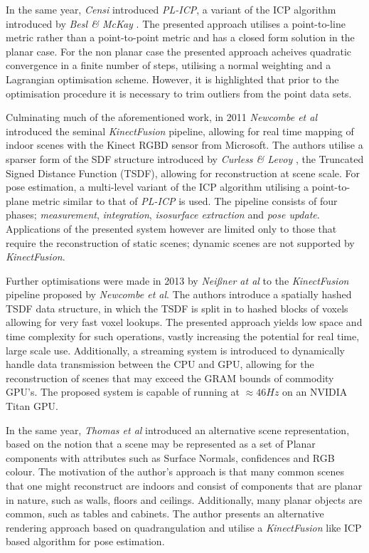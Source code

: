 In the same year, \textit{Censi} \cite{Censi2008} introduced \textit{PL-ICP}, a 
variant of the ICP algorithm introduced by \textit{Besl \& McKay} \cite{Besl1992}. 
The presented approach utilises a point-to-line metric rather than a point-to-point 
metric and has a closed form solution in the planar case. For the non planar case 
the presented approach acheives quadratic convergence in a finite number of steps, 
utilising a normal weighting and a Lagrangian optimisation scheme. However, it is 
highlighted that prior to the optimisation procedure it is necessary to trim outliers 
from the point data sets.

Culminating much of the aforementioned work, in 2011 \textit{Newcombe et al} introduced 
the seminal \textit{KinectFusion} pipeline, allowing for real time mapping of indoor 
scenes with the Kinect RGBD sensor from Microsoft. The authors utilise a sparser form 
of the SDF structure introduced by \textit{Curless \& Levoy} \cite{Curless1996}, the 
Truncated Signed Distance Function (TSDF), allowing for reconstruction at scene scale. 
For pose estimation, a multi-level variant of the ICP algorithm utilising a point-to-plane 
metric similar to that of \textit{PL-ICP} \cite{Censi2008} is used. The pipeline consists 
of four phases; \textit{measurement}, \textit{integration}, \textit{isosurface extraction} 
and \textit{pose update}. Applications of the presented system however are limited only to 
those that require the reconstruction of static scenes; dynamic scenes are not supported 
by \textit{KinectFusion}.

Further optimisations were made in 2013 by \textit{Nei{\ss}ner at al} \cite{NieBner2013} to the 
\textit{KinectFusion} pipeline proposed by \textit{Newcombe et al}. The authors introduce a 
spatially hashed TSDF data structure, in which the TSDF is split in to hashed blocks of voxels 
allowing for very fast voxel lookups. The presented approach yields low space and time complexity 
for such operations, vastly increasing the potential for real time, large scale use. Additionally, 
a streaming system is introduced to dynamically handle data transmission between the CPU and GPU, 
allowing for the reconstruction of scenes that may exceed the GRAM bounds of commodity GPU's. The 
proposed system is capable of running at $\approx46Hz$ on an NVIDIA Titan GPU.

In the same year, \textit{Thomas et al} \cite{Thomas2013} introduced an alternative scene 
representation, based on the notion that a scene may be represented as a set of Planar 
components with attributes such as Surface Normals, confidences and RGB colour. The motivation 
of the author's approach is that many common scenes that one might reconstruct are indoors and 
consist of components that are planar in nature, such as walls, floors and ceilings. Additionally, 
many planar objects are common, such as tables and cabinets. The author presents an alternative 
rendering approach based on quadrangulation \cite{QUAD} and utilise a \textit{KinectFusion} 
\cite{Newcombe2011} like ICP based algorithm for pose estimation.

